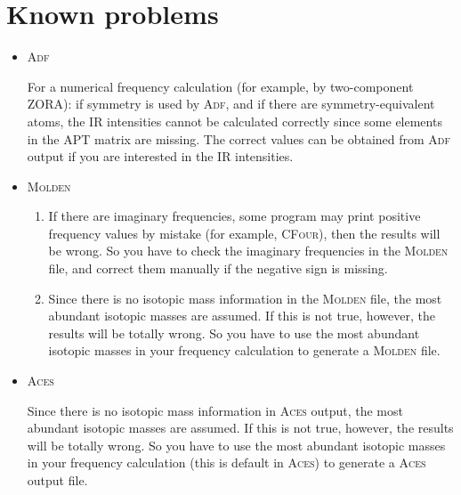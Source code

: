 \documentclass[12pt,english]{extarticle}
\begin{document}
\pagebreak{}


\section{Known problems} \label{part:problem}

\begin{itemize}
\item \textsc{Adf}

For a numerical frequency calculation (for example, by two-component ZORA): if symmetry is used by \textsc{Adf}, and if
there are symmetry-equivalent atoms, the IR intensities cannot be calculated correctly since some elements in the APT matrix are
missing. The correct values can be obtained from \textsc{Adf} output if you are interested in the IR intensities.

\item \textsc{Molden}

\begin{enumerate}
\item If there are imaginary frequencies, some program may print positive frequency values
by mistake (for example, \textsc{CFour}), then the results will be wrong. So you have to
check the imaginary frequencies in the \textsc{Molden} file, and correct them manually
if the negative sign is missing.

\item Since there is no isotopic mass information in the \textsc{Molden} file, the most
abundant isotopic masses are assumed. If this is not true, however, the results
will be totally wrong. So you have to use the most abundant isotopic masses
in your frequency calculation to generate a \textsc{Molden} file.
\end{enumerate}

\item \textsc{Aces}

Since there is no isotopic mass information in \textsc{Aces} output, the most
abundant isotopic masses are assumed. If this is not true, however, the results
will be totally wrong. So you have to use the most abundant isotopic masses
in your frequency calculation (this is default in \textsc{Aces}) to generate a \textsc{Aces} output file.


\end{itemize}
\end{document}
